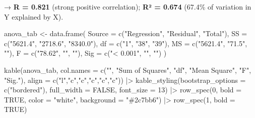 \documentclass[
  12pt,
  letterpaper,
]{book}
\newenvironment{Shaded}{\begin{snugshade}}{\end{snugshade}}
\newcommand{\AttributeTok}[1]{\textcolor[rgb]{0.40,0.45,0.13}{#1}}
\newcommand{\ConstantTok}[1]{\textcolor[rgb]{0.56,0.35,0.01}{#1}}
\newcommand{\DecValTok}[1]{\textcolor[rgb]{0.68,0.00,0.00}{#1}}
\newcommand{\FunctionTok}[1]{\textcolor[rgb]{0.28,0.35,0.67}{#1}}
\newcommand{\NormalTok}[1]{\textcolor[rgb]{0.00,0.23,0.31}{#1}}
\newcommand{\OtherTok}[1]{\textcolor[rgb]{0.00,0.23,0.31}{#1}}
\newcommand{\SpecialCharTok}[1]{\textcolor[rgb]{0.37,0.37,0.37}{#1}}
\newcommand{\StringTok}[1]{\textcolor[rgb]{0.13,0.47,0.30}{#1}}
\begin{document}
\endgroup{}

→ \textbf{R = 0.821} (strong positive correlation); \textbf{R² = 0.674}
(67.4\% of variation in Y explained by X).

\begin{Shaded}
\begin{Highlighting}[]
\NormalTok{anova\_tab }\OtherTok{\textless{}{-}} \FunctionTok{data.frame}\NormalTok{(}
  \AttributeTok{Source =} \FunctionTok{c}\NormalTok{(}\StringTok{"Regression"}\NormalTok{, }\StringTok{"Residual"}\NormalTok{, }\StringTok{"Total"}\NormalTok{),}
  \AttributeTok{SS =} \FunctionTok{c}\NormalTok{(}\StringTok{"5621.4"}\NormalTok{, }\StringTok{"2718.6"}\NormalTok{, }\StringTok{"8340.0"}\NormalTok{),}
  \AttributeTok{df =} \FunctionTok{c}\NormalTok{(}\StringTok{"1"}\NormalTok{, }\StringTok{"38"}\NormalTok{, }\StringTok{"39"}\NormalTok{),}
  \AttributeTok{MS =} \FunctionTok{c}\NormalTok{(}\StringTok{"5621.4"}\NormalTok{, }\StringTok{"71.5"}\NormalTok{, }\StringTok{""}\NormalTok{),}
  \AttributeTok{F =} \FunctionTok{c}\NormalTok{(}\StringTok{"78.62"}\NormalTok{, }\StringTok{""}\NormalTok{, }\StringTok{""}\NormalTok{),}
  \AttributeTok{Sig =} \FunctionTok{c}\NormalTok{(}\StringTok{"\textless{} 0.001"}\NormalTok{, }\StringTok{""}\NormalTok{, }\StringTok{""}\NormalTok{)}
\NormalTok{)}

\FunctionTok{kable}\NormalTok{(anova\_tab,}
      \AttributeTok{col.names =} \FunctionTok{c}\NormalTok{(}\StringTok{""}\NormalTok{, }\StringTok{"Sum of Squares"}\NormalTok{, }\StringTok{"df"}\NormalTok{, }\StringTok{"Mean Square"}\NormalTok{, }\StringTok{"F"}\NormalTok{, }\StringTok{"Sig."}\NormalTok{),}
      \AttributeTok{align =} \FunctionTok{c}\NormalTok{(}\StringTok{"l"}\NormalTok{,}\StringTok{"c"}\NormalTok{,}\StringTok{"c"}\NormalTok{,}\StringTok{"c"}\NormalTok{,}\StringTok{"c"}\NormalTok{,}\StringTok{"c"}\NormalTok{)) }\SpecialCharTok{|\textgreater{}}
  \FunctionTok{kable\_styling}\NormalTok{(}\AttributeTok{bootstrap\_options =} \FunctionTok{c}\NormalTok{(}\StringTok{"bordered"}\NormalTok{),}
                \AttributeTok{full\_width =} \ConstantTok{FALSE}\NormalTok{, }\AttributeTok{font\_size =} \DecValTok{13}\NormalTok{) }\SpecialCharTok{|\textgreater{}}
  \FunctionTok{row\_spec}\NormalTok{(}\DecValTok{0}\NormalTok{, }\AttributeTok{bold =} \ConstantTok{TRUE}\NormalTok{, }\AttributeTok{color =} \StringTok{"white"}\NormalTok{, }\AttributeTok{background =} \StringTok{"\#2c7bb6"}\NormalTok{) }\SpecialCharTok{|\textgreater{}}
  \FunctionTok{row\_spec}\NormalTok{(}\DecValTok{1}\NormalTok{, }\AttributeTok{bold =} \ConstantTok{TRUE}\NormalTok{)}
\end{Highlighting}
\end{Shaded}
\end{document}
